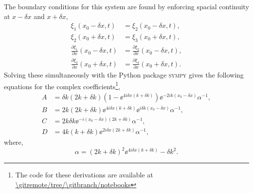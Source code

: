 The boundary conditions for this system are found by enforcing spacial continuity at \(x - \delta x\) and \(x + \delta x\),
%
\begin{align*}
    \xi_1(x_0 - \delta x, t) &= \xi_2(x_0 - \delta x, t), \\
    \xi_2(x_0 + \delta x, t) &= \xi_3(x_0 + \delta x, t), \\
    \frac{\partial \xi_1}{\partial x}(x_0 - \delta x, t) &= \frac{\partial \xi_2}{\partial x}(x_0 - \delta x, t), \\
    \frac{\partial \xi_2}{\partial x}(x_0 + \delta x, t) &= \frac{\partial \xi_3}{\partial x}(x_0 + \delta x, t).
\end{align*}
%
Solving these simultaneously with the Python package \textsc{sympy} gives the following equations for the complex coefficients\footnote{The code for these derivations are available at \url{\gitremote/tree/\gitbranch/notebooks}},
%
\begin{align}
    A &= \delta k (2k + \delta k) (1 - \ee^{4i \delta x (k + \delta k)}) \ee^{- 2i k (x_0 - \delta x)} \alpha^{-1}, \\
    B &= 2 k (2k + \delta k) \ee^{4i \delta x (k + \delta k)} \ee^{i \delta k (x_0 - \delta x)} \alpha^{-1}, \\
    C &= 2 k \delta k \ee^{- i (x_0 - \delta x) (2k + \delta k)} \alpha^{-1}, \\
    D &= 4 k (k + \delta k) \ee^{2 i \delta x (2k + \delta k)} \alpha^{-1},
\end{align}
%
where,
\begin{equation}
    \alpha = (2k + \delta k)^2 \ee^{4 i \delta x (k + \delta k)} - \delta k^2.
\end{equation}
%


